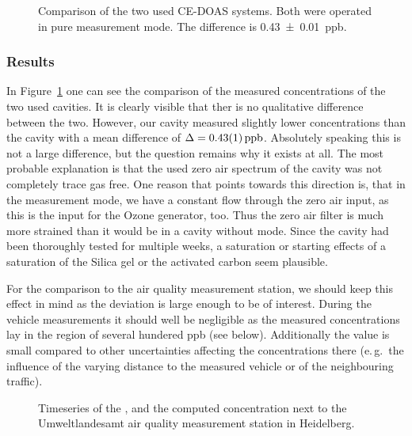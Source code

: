 \begin{figure}[htbp]
  \centering
  
  \caption{Comparison of the two used CE-DOAS systems. Both were
    operated in pure  measurement mode. The difference is
    \SI{0.43 \pm 0.01}{ppb}.}
  \label{fig:hd-comparison}
\end{figure}

\subsubsection{Results}
\label{sec:vehicle-results}

In Figure~\ref{fig:hd-comparison} one can see the comparison of the
measured  concentrations of the two used cavities. It is
clearly visible that ther is no qualitative difference between the
two. However, our  cavity measured slightly lower
concentrations than the  cavity with a mean difference of
$\Delta = \SI{0.43\pm0.01}{ppb}$. Absolutely speaking this is not a
large difference, but the question remains why it exists at all. The
most probable explanation is that the used zero air spectrum of the
 cavity was not completely trace gas free. One reason that
points towards this direction is, that in the  measurement
mode, we have a constant flow through the zero air input, as this is
the input for the Ozone generator, too. Thus the zero air filter is much
more strained than it would be in a cavity without 
mode. Since the cavity had been thoroughly tested for multiple
weeks, a saturation or starting effects of a saturation of
the Silica gel or the activated carbon seem plausible.

For the comparison to the air quality measurement station, we should
keep this effect in mind as the deviation is large enough to be of
interest. During the vehicle measurements it should well be
negligible as the measured concentrations lay in the region of several
hundered \si{ppb} (see below). Additionally the value is small
compared to other uncertainties affecting the concentrations there
(e.\,g.\ the influence of the varying distance to the measured
vehicle or of the neighbouring traffic).

\begin{figure}[htbp]
  \centering
  
  \caption{Timeseries of the ,  and the computed
     concentration next to the Umweltlandesamt air quality
    measurement station in Heidelberg.}
  \label{fig:umba}
\end{figure}


